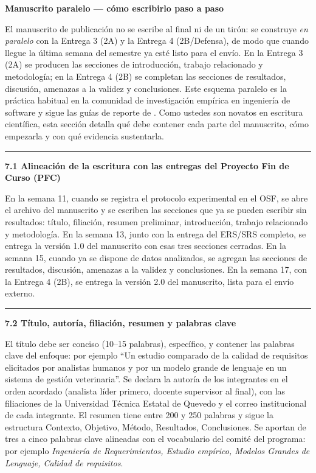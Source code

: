 \documentclass[11pt,a4paper]{article}
\newcounter{secc}
\newcommand{\secband}[1]{%
    \stepcounter{secc}\par\vspace{9pt}\noindent
    {\setlength{\fboxsep}{0pt}%
        \colorbox{uteqgold}{\parbox[c][20pt][c]{0.05\textwidth}{\centering\textbf{\color{white}\small \arabic{secc}}}}%
        \colorbox{uteqgreen}{\parbox[c][20pt][c]{0.95\textwidth}{\hspace{8pt}\textbf{\color{white}\small #1}}}%
    }\par\vspace{5pt}}
\newcommand{\submark}[1]{\par\vspace{4pt}\noindent
    {\color{uteqgreen}\rule[-1pt]{3.5pt}{12pt}}\hspace{6pt}\textbf{\color{uteqgreen}#1}\par\vspace{2pt}}
\begin{document}
\secband{Manuscrito paralelo --- cómo escribirlo paso a paso}

El manuscrito de publicación no se escribe al final ni de un tirón: se construye \emph{en paralelo} con la Entrega 3 (2A) y la Entrega 4 (2B/Defensa), de modo que cuando llegue la última semana del semestre ya esté listo para el envío.
En la Entrega 3 (2A) se producen las secciones de introducción, trabajo relacionado y metodología; en la Entrega 4 (2B) se completan las secciones de resultados, discusión, amenazas a la validez y conclusiones.
Este esquema paralelo es la práctica habitual en la comunidad de investigación empírica en ingeniería de software y sigue las guías de reporte de \cite{jedlitschka2008reporting,runeson2009guidelines,wohlin2012experimentation}.
Como ustedes son novatos en escritura científica, esta sección detalla qué debe contener cada parte del manuscrito, cómo empezarla y con qué evidencia sustentarla.

\submark{7.1 Alineación de la escritura con las entregas del Proyecto Fin de Curso (PFC)}
En la semana 11, cuando se registra el protocolo experimental en el OSF, se abre el archivo del manuscrito y se escriben las secciones que ya se pueden escribir sin resultados: título, filiación, resumen preliminar, introducción, trabajo relacionado y metodología.
En la semana 13, junto con la entrega del ERS/SRS completo, se entrega la versión 1.0 del manuscrito con esas tres secciones cerradas.
En la semana 15, cuando ya se dispone de datos analizados, se agregan las secciones de resultados, discusión, amenazas a la validez y conclusiones.
En la semana 17, con la Entrega 4 (2B), se entrega la versión 2.0 del manuscrito, lista para el envío externo.

\submark{7.2 Título, autoría, filiación, resumen y palabras clave}
El título debe ser conciso (10--15 palabras), específico, y contener las palabras clave del enfoque: por ejemplo ``Un estudio comparado de la calidad de requisitos elicitados por analistas humanos y por un modelo grande de lenguaje en un sistema de gestión veterinaria''.
Se declara la autoría de los integrantes en el orden acordado (analista líder primero, docente supervisor al final), con las filiaciones de la Universidad Técnica Estatal de Quevedo y el correo institucional de cada integrante.
El resumen tiene entre 200 y 250 palabras y sigue la estructura Contexto, Objetivo, Método, Resultados, Conclusiones.
Se aportan de tres a cinco palabras clave alineadas con el vocabulario del comité del programa: por ejemplo \emph{Ingeniería de Requerimientos, Estudio empírico, Modelos Grandes de Lenguaje, Calidad de requisitos}.
\end{document}
